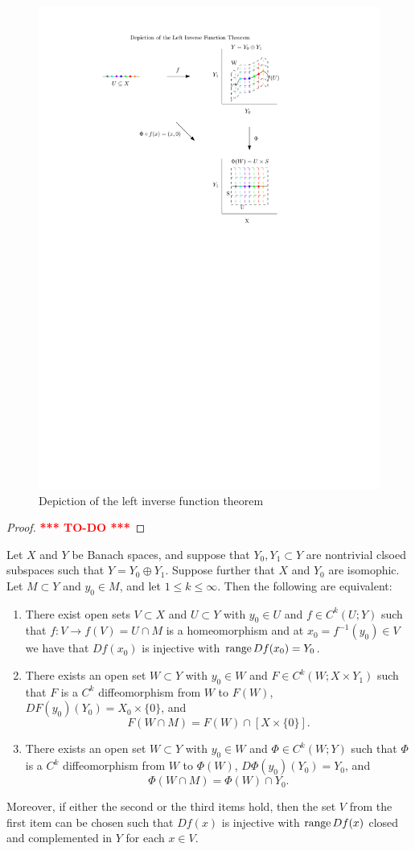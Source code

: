 \documentclass[a4paper]{article}
\newcommand{\TODO}{\textcolor{red}{\textbf{*** TO-DO ***}}}
\begin{document}
\begin{figure}[h!]
  \centering
  \includegraphics[width=0.55\linewidth]{fig/left_inverse.pdf}
  \caption{Depiction of the left inverse function theorem}
\end{figure}

\begin{proof}
\TODO
\end{proof}

\begin{thm}
Let $X$ and $Y$ be Banach spaces, and suppose that 
$Y_0, Y_1 \subset Y$ are nontrivial clsoed subspaces 
such that $Y = Y_0 \oplus Y_1$. Suppose further that 
$X$ and $Y_0$ are isomophic. Let $M \subset Y$ and 
$y_0 \in M$, and let $1 \leq k \leq \infty$. Then the 
following are equivalent: 
\begin{enumerate}
\item There exist open sets $V \subset X$ and $U \subset Y$ 
with $y_0 \in U$ and $f \in C^k(U ; Y)$ such that $f : 
V \to f(V) = U \cap M$ is a homeomorphism and at $x_0 
= f^{-1}(y_0) \in V$ we have that $Df(x_0)$ is injective
with $\operatorname{range} Df(x_0) = Y_0$.

\item There exists an open set $W \subset Y$ with $y_0 \in W$ 
and $F \in C^k(W ; X \times Y_1)$ such that $F$ is a 
$C^k$ diffeomorphism from $W$ to $F(W)$, $DF(y_0)(Y_0)
= X_0 \times \{0\}$, and 
\[
F(W \cap M) = F(W) \cap [X \times \{0\}].
\]

\item There exists an open set $W \subset Y$ with $y_0 \in W$
and $\Phi \in C^k(W ; Y)$ such that $\Phi$ is a $C^k$ 
diffeomorphism from $W$ to $\Phi(W)$, $D \Phi(y_0) (Y_0) 
= Y_0$, and 
\[
\Phi(W \cap M) = \Phi(W) \cap Y_0.
\]
\end{enumerate}

Moreover, if either the second or the third items hold, then 
the set $V$ from the first item can be chosen such that 
$Df(x)$ is injective with $\operatorname{range} Df(x)$ closed and 
complemented in $Y$ for each $x \in V$.
\end{thm}
\end{document}
